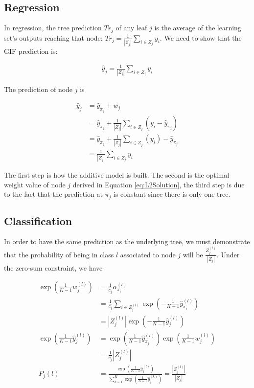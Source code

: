\documentclass{article}
\begin{document}
\subsection{Regression}
In regression, the tree prediction $Tr_j$ of any leaf $j$ is the average of the 
learning set's outputs reaching that node: $Tr_j = \frac{1}{|Z_j|}\sum_{i \in 
Z_j} y_i$. We need to show that the GIF prediction is:

\vspace*{-\baselineskip}
\begin{align}\label{eq:EquivL2Cond}
\hat{y}_{j} = \frac{1}{|Z_j|}\sum_{i \in Z_j} y_i
\end{align}
\vspace*{-\baselineskip}


The prediction of node $j$ is

\vspace*{-\baselineskip}
\begin{align}\label{eq:EquivL2Solution}
\hat{y}_j &= \hat{y}_{\pi_j} + w_j \\
&= \hat{y}_{\pi_j} +  \frac{1}{|Z_j|} \sum_{i \in Z_j} \left(y_i - 
\hat{y}_{\pi_j}\right) \\
&= \hat{y}_{\pi_j} + \frac{1}{|Z_j|} \sum_{i \in Z_j} \left( y_i \right) - 
\hat{y}_{\pi_j} \\
&= \frac{1}{|Z_j|} \sum_{i \in Z_j}  y_i 
\end{align}
\vspace*{-\baselineskip}

The first step is how the additive model is built. The second is the optimal 
weight value of node $j$ derived in Equation \ref{eq:L2Solution}, the third 
step is due to the fact that the prediction at $\pi_j$ is constant since there 
is only one tree.

\subsection{Classification}
In order to have the same prediction as the underlying tree, we must 
demonstrate that the probability of being in class $l$ associated to node $j$ 
will be $\frac{Z_j^{(l)}}{|Z_j|}$.
Under the zero-sum constraint, we have

\vspace*{-\baselineskip}
\begin{align} 
\exp \left(  \frac{1}{K-1} w_j^{(l)}\right) &= \frac{1}{c_j} 
\alpha_{\pi_i}^{(l)} \\
&=  \frac{1}{c_j} \sum_{i \in Z_j^{(l)}} \exp \left(-\frac{1}{K-1} 
\hat{y}_{\pi_i}^{(l)}\right)\\
&= |Z_j^{(l)}| \exp \left(-\frac{1}{K-1} \hat{y}_j^{(l)}\right) \\
\exp \left(\frac{1}{K-1} \hat{y}_j^{(l)} \right) &= \exp \left(\frac{1}{K-1} 
\hat{y}_{\pi_j}^{(l)} \right) \exp \left(\frac{1}{K-1} w_j^{(l)}\right) \\
&= \frac{1}{c_j} |Z_j^{(l)}| \\
P_j(l) &= \frac{\exp \left(\frac{1}{K-1} \hat{y}_j^{(l)}
\right)}{\sum_{k=1}^K\exp \left(\frac{1}{K-1} \hat{y}_j^{(k)} \right)} = 
\frac{|Z_j^{(l)}|}{|Z_j|}
\end{align}
\vspace*{-\baselineskip}
\end{document}
